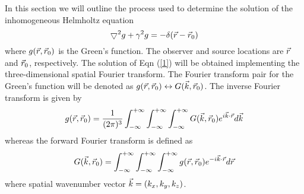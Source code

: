 In this section  we will outline the process used  to determine the solution 
of the inhomogeneous Helmholtz equation
%
\begin{equation}
\label{1}
\bigtriangledown^2 g + \gamma^2 g= -\delta( \vec{r}- \vec{r}_0 )                     
\end{equation}
%
where $g(\vec{r}  , \vec{r} _0)$  is the Green's function.
The observer and source locations are  $\vec{r}$ and $\vec{r}_0$, respectively.
The solution of Eqn (\ref{1})
will be obtained implementing the three-dimensional spatial Fourier transform.
The Fourier transform pair for the Green's function
will be denoted as $g( {\vec{r} , \vec{r} _0} ) \leftrightarrow G({\vec {k} , \vec{r}_0} )$.
The inverse Fourier transform is given by
%
\begin{equation}
\label{int1}
g({\vec{r} ,\vec{r}_0})= 
\frac{1}{(2\pi)^3}\int_{-\infty}^{+\infty} \int_{-\infty}^{+\infty} \int_{-\infty}^{+\infty} 
G({\vec {k}}, \vec{r}_{0} ) 
e^{i{\vec {k}\cdot\vec{r} }} 
d\vec {k} 
\end{equation}
whereas the forward Fourier transform is defined as
\begin{equation}
\label{int2}
G(\vec {k},\vec{r}_{0})= \int_{-\infty}^{+\infty} \int_{-\infty}^{+\infty} \int_{-\infty}^{+\infty} g({\vec{r}}, \vec{r}_0 ) e^{-i{\vec {k}\cdot\vec{r} }} d\vec{r} 
\end{equation}
%
where spatial wavenumber vector ${\vec {k}} = ( k_x , k_y ,k_z ) $.

